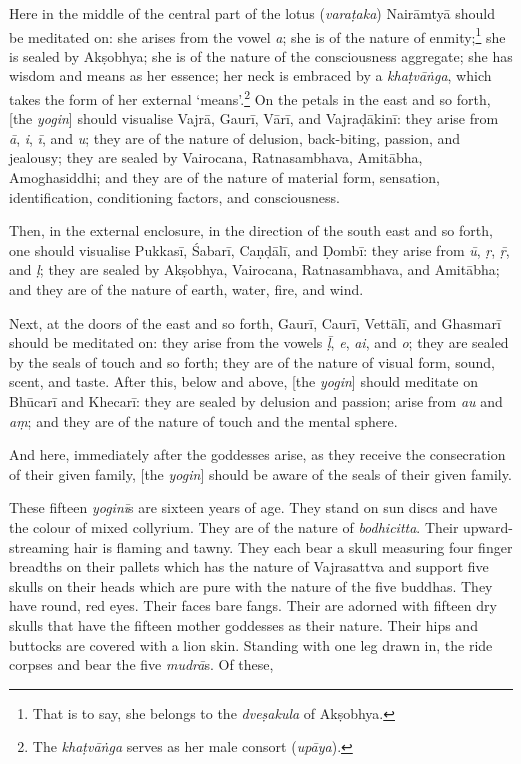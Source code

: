 \documentclass[naipra.tex]{subfiles}
\begin{document}
Here in the middle of the central part of the lotus (\emph{varaṭaka}) Nairāmtyā should be meditated on: she arises from the vowel \emph{a}; she is of the nature of enmity;\footnote{
	That is to say, she belongs to the \emph{dveṣakula} of Akṣobhya.
} she is sealed by Akṣobhya; she is of the nature of the consciousness aggregate; she has wisdom and means as her essence; her neck is embraced by a \emph{khaṭvāṅga}, which takes the form of her external `means'.\footnote{
	The \emph{khaṭvāṅga} serves as her male consort (\emph{upāya}).
} On the petals in the east and so forth, [the \emph{yogin}] should visualise Vajrā, Gaurī, Vārī, and Vajraḍākinī: they arise from \emph{ā}, \emph{i}, \emph{ī}, and \emph{u}; they are of the nature of delusion, back-biting, passion, and jealousy; they are sealed by Vairocana, Ratnasambhava, Amitābha, Amoghasiddhi; and they are of the nature of material form, sensation, identification, conditioning factors, and consciousness.

Then, in the external enclosure, in the direction of the south east and so forth, one should visualise Pukkasī, Śabarī, Caṇḍālī, and Ḍombī: they arise from \emph{ū}, \emph{ṛ}, \emph{ṝ}, and \emph{ḷ}; they are sealed by Akṣobhya, Vairocana, Ratnasambhava, and Amitābha; and they are of the nature of earth, water, fire, and wind.

Next, at the doors of the east and so forth, Gaurī, Caurī, Vettālī, and Ghasmarī should be meditated on: they arise from the vowels \emph{ḹ}, \emph{e}, \emph{ai}, and \emph{o}; they are sealed by the seals of touch and so forth; they are of the nature of visual form, sound, scent, and taste.
After this, below and above, [the \emph{yogin}] should meditate on Bhūcarī and Khecarī: they are sealed by delusion and passion; arise from \emph{au} and \emph{aṃ}; and they are of the nature of touch and the mental sphere.

And here, immediately after the goddesses arise, as they receive the consecration of their given family, [the \emph{yogin}] should be aware of the seals of their given family. 

These fifteen \emph{yoginī}s are sixteen years of age.
They stand on sun discs and have the colour of mixed collyrium.
They are of the nature of \emph{bodhicitta}.
Their upward-streaming hair is flaming and tawny.
They each bear a skull measuring four finger breadths \crux on their pallets \crux which has the nature of Vajrasattva and support five skulls on their heads which are pure with the nature of the five buddhas.
They have round, red eyes.
Their faces bare fangs.
Their are adorned with fifteen dry skulls that have the fifteen mother goddesses as their nature.
Their hips and buttocks are covered with a lion skin.
Standing with one leg drawn in, the ride corpses and bear the five \emph{mudrā}s. 
Of these,
\end{document}

